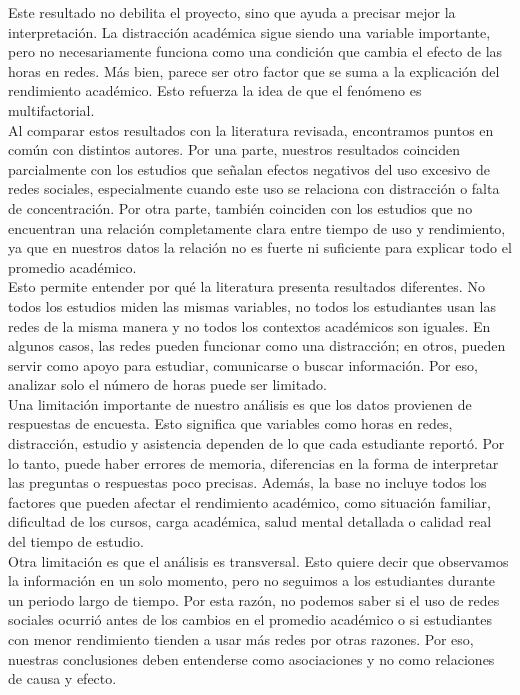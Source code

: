 \documentclass[12pt]{article}
\begin{document}
Este resultado no debilita el proyecto, sino que ayuda a precisar mejor la interpretación. La distracción académica sigue siendo una variable importante, pero no necesariamente funciona como una condición que cambia el efecto de las horas en redes. Más bien, parece ser otro factor que se suma a la explicación del rendimiento académico. Esto refuerza la idea de que el fenómeno es multifactorial.
\\

Al comparar estos resultados con la literatura revisada, encontramos puntos en común con distintos autores. Por una parte, nuestros resultados coinciden parcialmente con los estudios que señalan efectos negativos del uso excesivo de redes sociales, especialmente cuando este uso se relaciona con distracción o falta de concentración. Por otra parte, también coinciden con los estudios que no encuentran una relación completamente clara entre tiempo de uso y rendimiento, ya que en nuestros datos la relación no es fuerte ni suficiente para explicar todo el promedio académico.
\\

Esto permite entender por qué la literatura presenta resultados diferentes. No todos los estudios miden las mismas variables, no todos los estudiantes usan las redes de la misma manera y no todos los contextos académicos son iguales. En algunos casos, las redes pueden funcionar como una distracción; en otros, pueden servir como apoyo para estudiar, comunicarse o buscar información. Por eso, analizar solo el número de horas puede ser limitado.
\\

Una limitación importante de nuestro análisis es que los datos provienen de respuestas de encuesta. Esto significa que variables como horas en redes, distracción, estudio y asistencia dependen de lo que cada estudiante reportó. Por lo tanto, puede haber errores de memoria, diferencias en la forma de interpretar las preguntas o respuestas poco precisas. Además, la base no incluye todos los factores que pueden afectar el rendimiento académico, como situación familiar, dificultad de los cursos, carga académica, salud mental detallada o calidad real del tiempo de estudio.
\\

Otra limitación es que el análisis es transversal. Esto quiere decir que observamos la información en un solo momento, pero no seguimos a los estudiantes durante un periodo largo de tiempo. Por esta razón, no podemos saber si el uso de redes sociales ocurrió antes de los cambios en el promedio académico o si estudiantes con menor rendimiento tienden a usar más redes por otras razones. Por eso, nuestras conclusiones deben entenderse como asociaciones y no como relaciones de causa y efecto.
\\
\end{document}
